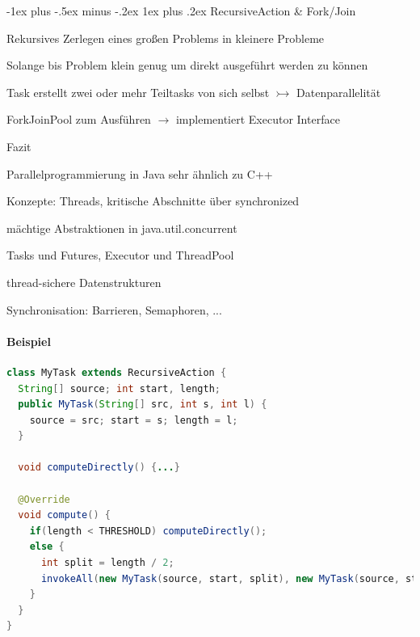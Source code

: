 \documentclass[10pt]{article}
\makeatletter
\renewcommand{\subsubsection}{\@startsection{subsubsection}{3}{0mm}%
                                {-1ex plus -.5ex minus -.2ex}%
                                {1ex plus .2ex}%
                                {\normalfont\small\bfseries}}
\makeatother
\begin{document}
  \subsubsection{RecursiveAction \& Fork/Join}
  \begin{itemize*}
    \item Rekursives Zerlegen eines großen Problems in kleinere Probleme
    \item Solange bis Problem klein genug um direkt ausgeführt werden zu können
    \item Task erstellt zwei oder mehr Teiltasks von sich selbst $\rightarrowtail$ Datenparallelität
    \item ForkJoinPool zum Ausführen $\rightarrow$ implementiert Executor Interface
    \item Fazit
    \begin{itemize*}
      \item Parallelprogrammierung in Java sehr ähnlich zu C++
      \item Konzepte: Threads, kritische Abschnitte über synchronized
      \item mächtige Abstraktionen in java.util.concurrent
      \begin{itemize*}
        \item Tasks und Futures, Executor und ThreadPool
        \item thread-sichere Datenstrukturen
        \item Synchronisation: Barrieren, Semaphoren, ...
      \end{itemize*}
    \end{itemize*}
  \end{itemize*}
  
  \paragraph{Beispiel}
  \begin{lstlisting}[language=java]
class MyTask extends RecursiveAction {
  String[] source; int start, length;
  public MyTask(String[] src, int s, int l) {
    source = src; start = s; length = l;
  }

  void computeDirectly() {...}

  @Override
  void compute() {
    if(length < THRESHOLD) computeDirectly();
    else {
      int split = length / 2;
      invokeAll(new MyTask(source, start, split), new MyTask(source, start+split, length-split))
    }
  }
}
\end{lstlisting}
  
\end{document}
